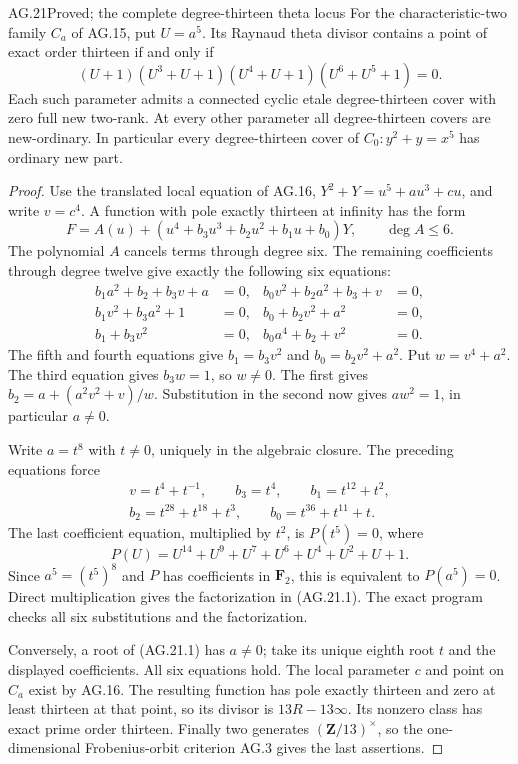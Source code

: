 \begin{claim}{AG.21}{Proved; the complete degree-thirteen theta locus}
For the characteristic-two family $C_a$ of AG.15, put
$U=a^5$. Its Raynaud theta divisor contains a point
of exact order thirteen if and only if
\[
 (U+1)(U^3+U+1)(U^4+U+1)(U^6+U^5+1)=0.              \tag{AG.21.1}
\]
Each such parameter admits a connected cyclic etale
degree-thirteen cover with zero full new two-rank.
At every other parameter all degree-thirteen covers
are new-ordinary. In particular every degree-thirteen
cover of $C_0:y^2+y=x^5$ has ordinary new part.
\end{claim}
\begin{proof}
Use the translated local equation of AG.16,
$Y^2+Y=u^5+a u^3+c u$, and write $v=c^4$.
A function with pole exactly thirteen at infinity has
the form
\[
 F=A(u)+(u^4+b_3u^3+b_2u^2+b_1u+b_0)Y,
                  \qquad \deg A\le6.
\]
The polynomial $A$ cancels terms through degree six.
The remaining coefficients through degree twelve give
exactly the following six equations:
\[
 \begin{aligned}
 b_1a^2+b_2+b_3v+a&=0,&
 b_0v^2+b_2a^2+b_3+v&=0,\\
 b_1v^2+b_3a^2+1&=0,&
 b_0+b_2v^2+a^2&=0,\\
 b_1+b_3v^2&=0,&
 b_0a^4+b_2+v^2&=0.
 \end{aligned}
\]
The fifth and fourth equations give
$b_1=b_3v^2$ and $b_0=b_2v^2+a^2$.
Put $w=v^4+a^2$. The third equation gives
$b_3w=1$, so $w\ne0$. The first gives
$b_2=a+(a^2v^2+v)/w$. Substitution in the second
now gives $aw^2=1$, in particular $a\ne0$.

Write $a=t^8$ with $t\ne0$, uniquely in the algebraic
closure. The preceding equations force
\[
 \begin{gathered}
 v=t^4+t^{-1},\qquad b_3=t^4,\qquad b_1=t^{12}+t^2,\\
 b_2=t^{28}+t^{18}+t^3,
 \qquad b_0=t^{36}+t^{11}+t.
 \end{gathered}
\]
The last coefficient equation, multiplied by $t^2$,
is $P(t^5)=0$, where
\[
 P(U)=U^{14}+U^9+U^7+U^6+U^4+U^2+U+1.
\]
Since $a^5=(t^5)^8$ and $P$ has coefficients in
$\mathbf F_2$, this is equivalent to $P(a^5)=0$.
Direct multiplication gives the factorization in
(AG.21.1). The exact program
 checks all six
substitutions and the factorization.

Conversely, a root of (AG.21.1) has $a\ne0$; take
its unique eighth root $t$ and the displayed coefficients.
All six equations hold. The local parameter $c$ and
point on $C_a$ exist by AG.16. The resulting function
has pole exactly thirteen and zero at least thirteen
at that point, so its divisor is $13R-13\infty$.
Its nonzero class has exact prime order thirteen.
Finally two generates $(\mathbf Z/13)^\times$,
so the one-dimensional Frobenius-orbit criterion AG.3
gives the last assertions.
\end{proof}

